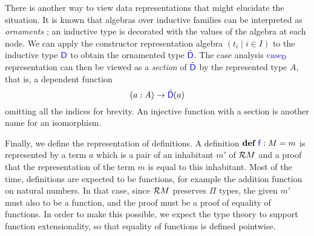 There is another way to view data representations that might elucidate the
situation. It is known that algebras over inductive families can be interpreted
as \emph{ornaments} \cite{Dagand2017-nj}; an inductive type is decorated with
the values of the algebra at each node. We can apply the constructor
representation algebra $(t_i \mid i \in I)$ to the inductive type ${\color{blue}{\mathsf{D}}}$ to
obtain the ornamented type $\tilde{{\color{blue}{\mathsf{D}}}}$. The case analysis ${\color{blue}{\mathsf{\textrm{case}_{D}}}}$
representation can then be viewed as a \emph{section} of $\tilde{{\color{blue}{\mathsf{D}}}}$ by
the represented type $A$, that is, a dependent function
\[
  (a : A) \to \tilde{{\color{blue}{\mathsf{D}}}}(a)
\]
omitting all the indices for brevity. An injective function with a section is
another name for an isomorphism.

Finally, we define the representation of definitions. A definition
$\textbf{def} \ {\color{blue}{\mathsf{f}}} : {M} = {m}$ is represented by a term $a$ which is a pair of an inhabitant
$m'$ of $\mathcal{R} {M}$ and a proof that the representation of the term $m$ is
equal to this inhabitant. Most of the time, definitions are expected to be
functions, for example the addition function on natural numbers. In that case,
since $\mathcal{R} {M}$ preserves $\Pi$ types, the given $m'$ must also to be a
function, and the proof must be a proof of equality of functions. In order to
make this possible, we expect the type theory to support function
extensionality, so that equality of functions is defined pointwise. 

